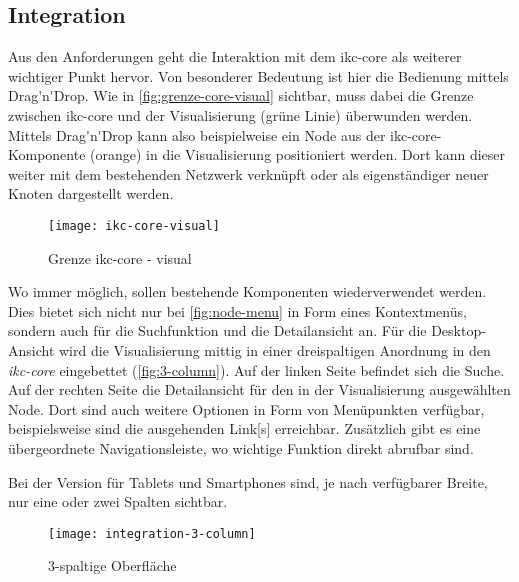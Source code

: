 \subsection{Integration}

Aus den Anforderungen geht die Interaktion mit dem \gls{ikc-core} als weiterer wichtiger Punkt hervor. Von besonderer Bedeutung ist hier die Bedienung mittels \gls{Drag'n'Drop}. Wie in \autoref{fig:grenze-core-visual} sichtbar, muss dabei die Grenze zwischen \gls{ikc-core} und der Visualisierung (grüne Linie) überwunden werden. Mittels \gls{Drag'n'Drop} kann also beispielweise ein \gls{Node} aus der \gls{ikc-core}-Komponente (orange) in die Visualisierung positioniert werden. Dort kann dieser weiter mit dem bestehenden \gls{Netzwerk} verknüpft oder als eigenständiger neuer Knoten dargestellt werden.

\begin{figure}[htbp]
\centering
\texttt{[image: ikc-core-visual]}
\caption{Grenze \gls{ikc-core} - visual}
\label{fig:grenze-core-visual}
\end{figure}

Wo immer möglich, sollen bestehende Komponenten wiederverwendet werden. Dies bietet sich nicht nur bei \autoref{fig:node-menu} in Form eines Kontextmenüs, sondern auch für die Suchfunktion und die Detailansicht an. Für die Desktop-Ansicht wird die Visualisierung mittig in einer dreispaltigen Anordnung in den \textit{ikc-core} eingebettet (\autoref{fig:3-column}). Auf der linken Seite befindet sich die Suche. Auf der rechten Seite die Detailansicht für den in der Visualisierung ausgewählten \gls{Node}. Dort sind auch weitere Optionen in Form von Menüpunkten verfügbar, beispielsweise sind die ausgehenden \gls{Link}[s] erreichbar. Zu\-sätz\-lich gibt es eine übergeordnete Navigationsleiste, wo wichtige Funktion direkt abrufbar sind.

Bei der Version für Tablets und Smartphones sind, je nach verfügbarer Breite, nur eine oder zwei Spalten sichtbar.

\begin{figure}[htbp]
\centering
\texttt{[image: integration-3-column]}
\caption{3-spaltige Oberfläche}
\label{fig:3-column}
\end{figure}

